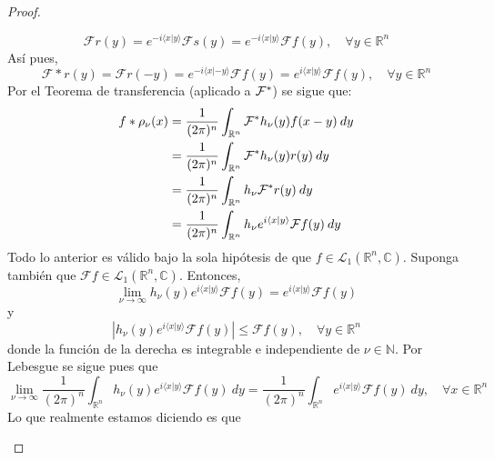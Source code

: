 \documentclass[12pt]{report}
\theoremstyle{largebreak}
\renewcommand{\leq}{\ensuremath{\leqslant}}
\newcommand\abs[1]{\ensuremath{\left|#1\right|}}
\newcommand\pint[2]{\ensuremath{\langle#1| #2\rangle}}
\newcommand{\fou}[1]{\ensuremath{\mathcal{F}#1}}
\begin{document}
\begin{proof}
\begin{enumerate}
\begin{equation*}
                \fou{r}(y)=e^{ -i\pint{x}{y}}\fou{s}(y)=e^{ -i\pint{x}{y}}\fou{f}(y),\quad\forall y\in\mathbb{R}^n
            \end{equation*}
            Así pues,
            \begin{equation*}
                \fou*{r}(y)=\fou{r}(-y)=e^{-i\pint{x}{-y}}\fou{f}(y)=e^{ i\pint{x}{y}}\fou{f}(y),\quad\forall y\in\mathbb{R}^n
            \end{equation*}
            Por el Teorema de transferencia (aplicado a $\fou^*{}$) se sigue que:
            \begin{equation*}
                \begin{split}
                    f*\rho_\nu(x)&=\frac{1}{(2\pi)^n}\int_{\mathbb{R}^n}\fou^*{h_\nu}(y)f(x-y)\:dy\\
                    &=\frac{1}{(2\pi)^n}\int_{\mathbb{R}^n}\fou^*{h_\nu}(y)r(y)\:dy\\
                    &=\frac{1}{(2\pi)^n}\int_{\mathbb{R}^n}h_\nu\fou^*{r}(y)\:dy\\
                    &=\frac{1}{(2\pi)^n}\int_{\mathbb{R}^n}h_\nu e^{i\pint{x}{y}}\fou{f}(y)\:dy\\
                \end{split}
            \end{equation*}
            Todo lo anterior es válido bajo la sola hipótesis de que $f\in\mathcal{L}_1(\mathbb{R}^n,\mathbb{C})$. Suponga también que $\fou{f}\in\mathcal{L}_1(\mathbb{R}^n,\mathbb{C})$. Entonces,
            \begin{equation*}
                \lim_{ \nu\rightarrow\infty}h_\nu(y)e^{ i\pint{x}{y}}\fou{f}(y)=e^{ i\pint{x}{y}}\fou{f}(y)
            \end{equation*}
            y
            \begin{equation*}
                \abs{h_\nu(y)e^{ i\pint{x}{y}}\fou{f}(y)}\leq\fou{f}(y),\quad\forall y\in\mathbb{R}^n
            \end{equation*}
            donde la función de la derecha es integrable e independiente de $\nu\in\mathbb{N}$. Por Lebesgue se sigue pues que
            \begin{equation*}
                \lim_{ \nu\rightarrow\infty}\frac{1}{(2\pi)^n}\int_{\mathbb{R}^n}h_\nu(y)e^{ i\pint{x}{y}}\fou{f}(y)\:dy=\frac{1}{(2\pi)^n}\int_{\mathbb{R}^n}e^{ i\pint{x}{y}}\fou{f}(y)\:dy,\quad\forall x\in\mathbb{R}^n
            \end{equation*}
            Lo que realmente estamos diciendo es que
            \begin{equation*}

\end{equation*}
\end{enumerate}
\end{proof}
\end{document}
